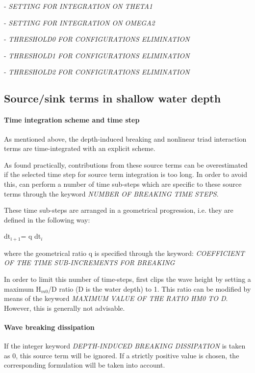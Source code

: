 - \textit{SETTING FOR INTEGRATION ON THETA1}

- \textit{SETTING FOR INTEGRATION ON OMEGA2}

- \textit{THRESHOLD0 FOR CONFIGURATIONS ELIMINATION}

- \textit{THRESHOLD1 FOR CONFIGURATIONS ELIMINATION}

- \textit{THRESHOLD2 FOR CONFIGURATIONS ELIMINATION}


\subsection{ Source/sink terms in shallow water depth}
\label{se:sourcshallow}

\paragraph{ Time integration scheme and time step}

 As mentioned above, the depth-induced breaking and nonlinear triad interaction terms are time-integrated with an explicit scheme.

 As found practically, contributions from these source terms can be overestimated if the selected time step for source term integration is too long. In order to avoid this, \tomawac can perform a number of time sub-steps which are specific to these source terms through the keyword \textit{NUMBER OF BREAKING TIME STEPS}.

 These time sub-steps are arranged in a geometrical progression, i.e. they are defined in the following way:

dt${}_{i+1 }$= q dt${}_{i}$

 where the geometrical ratio q is specified through the keyword: \textit{COEFFICIENT OF THE TIME SUB-INCREMENTS FOR BREAKING}

 In order to limit this number of time-steps, \tomawac first clips the wave height by setting a maximum H${}_{m0}$/D ratio (D is the water depth) to 1. This ratio can be modified by means of the keyword \textit{MAXIMUM VALUE OF THE RATIO HM0 TO D}. However, this is generally not advisable.


\paragraph{ Wave breaking dissipation}

 If the integer keyword \textit{DEPTH-INDUCED BREAKING DISSIPATION} is taken as 0, this source term will be ignored. If a strictly positive value is chosen, the corresponding formulation will be taken into account.

